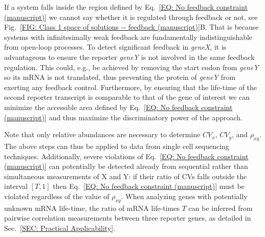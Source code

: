 \documentclass[%
 reprint,prx,
superscriptaddress,
%
%
%
%
%
%
%
%
%
 amsmath,amssymb,
 aps,
%
%
%
%
%
%
]{revtex4-2}
\begin{document}
{If a system falls inside the region defined by Eq.~\eqref{EQ: No feedback constraint (manuscript)} we cannot say whether it is regulated through feedback or not, see Fig.~\ref{FIG: Class 1 space of solutions -- feedback (manuscript)}B. That is because systems with infinitesimally weak feedback are fundamentally indistinguishable from open-loop processes. To detect significant feedback in \emph{geneX}, it is advantageous to ensure the reporter \emph{geneY} is not involved in the same feedback regulation. This could, e.g., be achieved by removing the start codon from \emph{geneY} so its mRNA is not translated, thus preventing the protein of \emph{geneY} from exerting any feedback control. Furthermore, by ensuring that the life-time of the second reporter transcript is comparable to that of the gene of interest we can minimize the accessible area defined by Eq.~\eqref{EQ: No feedback constraint (manuscript)}  and thus maximize the discriminatory power of the approach.}
%


Note that only relative abundances are necessary to determine $CV_{x}$, $CV_{y}$, and $\rho_{xy}$. The above steps  can thus be applied to data from single cell sequencing techniques. Additionally, severe violations of Eq.~\eqref{EQ: No feedback constraint (manuscript)} can potentially be detected already from sequential rather than simultaneous measurements of X and Y: if their ratio of CVs falls outside the interval $[T,1]$ then Eq.~\eqref{EQ: No feedback constraint (manuscript)} must be violated regardless of the value of $\rho_{xy}$. When analyzing genes with potentially unknown mRNA life-time, the ratio of mRNA life-times $T$ can be inferred from pairwise correlation measurements between three reporter genes, as detailed in Sec.~\ref{SEC: Practical Applicability}.
\end{document}
